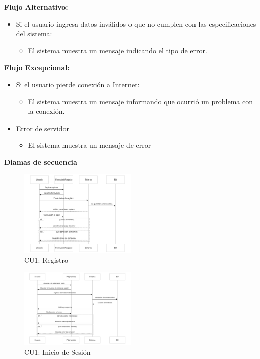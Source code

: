 \textbf{Flujo Alternativo:}
\begin{itemize}
\item Si el usuario ingresa datos inválidos o que no cumplen con las especificaciones del sistema:
\begin{itemize}
\item El sistema muestra un mensaje indicando el tipo de error.
\end{itemize}
\end{itemize}

\textbf{Flujo Excepcional:}
\begin{itemize}
\item Si el usuario pierde conexión a Internet:
\begin{itemize}
\item El sistema muestra un mensaje informando que ocurrió un problema con la conexión.
\end{itemize}
\item Error de servidor
\begin{itemize}
    \item El sistema muestra un mensaje de error
\end{itemize}
\end{itemize}

\textbf{Diamas de secuencia}
\begin{figure}[h]
    \centering
    \includegraphics[width=0.5\textwidth]{txt/cu1.png} %
    \caption{CU1: Registro}
    \label{fig: 1}
\end{figure} 

\begin{figure}[h]
    \centering
    \includegraphics[width=0.5\textwidth]{txt/cu2.png} %
    \caption{CU1: Inicio de Sesión}
    \label{fig: 1}
\end{figure}

